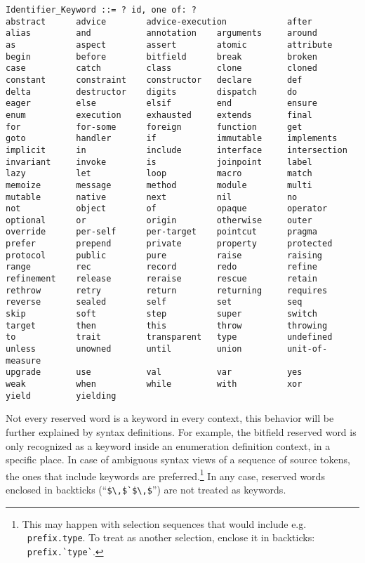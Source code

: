\syntax\begin{lstlisting}
Identifier_Keyword ::= ? id, one of: ?
abstract      advice        advice-execution            after
alias         and           annotation    arguments     around
as            aspect        assert        atomic        attribute
begin         before        bitfield      break         broken
case          catch         class         clone         cloned
constant      constraint    constructor   declare       def
delta         destructor    digits        dispatch      do
eager         else          elsif         end           ensure
enum          execution     exhausted     extends       final
for           for-some      foreign       function      get
goto          handler       if            immutable     implements
implicit      in            include       interface     intersection
invariant     invoke        is            joinpoint     label
lazy          let           loop          macro         match
memoize       message       method        module        multi
mutable       native        next          nil           no
not           object        of            opaque        operator
optional      or            origin        otherwise     outer
override      per-self      per-target    pointcut      pragma
prefer        prepend       private       property      protected
protocol      public        pure          raise         raising
range         rec           record        redo          refine
refinement    release       reraise       rescue        retain
rethrow       retry         return        returning     requires
reverse       sealed        self          set           seq
skip          soft          step          super         switch
target        then          this          throw         throwing
to            trait         transparent   type          undefined
unless        unowned       until         union         unit-of-measure
upgrade       use           val           var           yes
weak          when          while         with          xor
yield         yielding
\end{lstlisting}

Not every reserved word is a keyword in every context, this behavior will be further explained by syntax definitions. For example, the bitfield reserved word is only recognized as a keyword inside an enumeration definition context, in a specific place. In case of ambiguous syntax views of a sequence of source tokens, the ones that include keywords are preferred.\footnote{This may happen with selection sequences that would include e.g. ~\lstinline!prefix.type!. To treat  as another selection, enclose it in backticks: ~\lstinline[deletekeywords={type}]!prefix.`type`!.} In any case, reserved words enclosed in backticks (``\lstinline!$\,$`$\,$!'') are not treated as keywords. 






